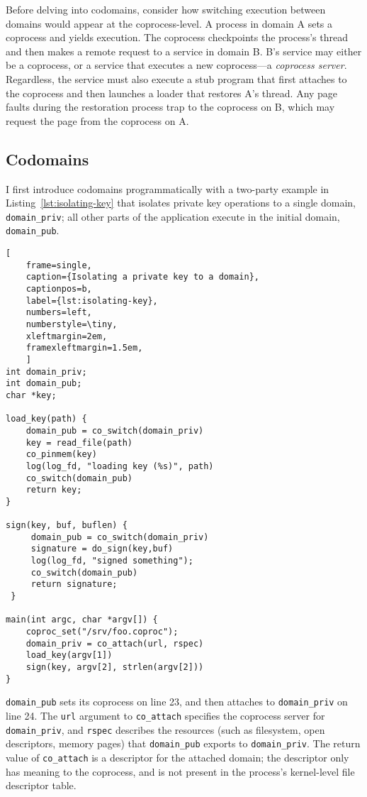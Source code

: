 %
Before delving into codomains, consider how switching execution between domains
would appear at the coprocess-level.
%
A process in domain A sets a coprocess and yields execution.
%
The coprocess checkpoints the process's thread and then makes a remote request
to a service in domain B\@.
%
B's service may either be a coprocess, or a service that executes a new
coprocess---a \emph{coprocess server}.
%
Regardless, the service must also execute a stub program that first attaches to
the coprocess and then launches a loader that restores A's thread.
%
Any page faults during the restoration process trap to the coprocess on B,
which may request the page from the coprocess on A.


\subsection{Codomains}

I first introduce codomains programmatically with a two-party example in
Listing~\ref{lst:isolating-key} that isolates private key operations to a
single domain, \texttt{domain\_priv}; all other parts of the application
execute in the initial domain, \texttt{domain\_pub}.

\begin{lstlisting}[
    frame=single, 
    caption={Isolating a private key to a domain},
    captionpos=b,
    label={lst:isolating-key},
    numbers=left,
    numberstyle=\tiny,
    xleftmargin=2em,
    framexleftmargin=1.5em,
    ]
int domain_priv;
int domain_pub;
char *key;

load_key(path) {
    domain_pub = co_switch(domain_priv)
    key = read_file(path)
    co_pinmem(key)
    log(log_fd, "loading key (%s)", path)
    co_switch(domain_pub)
    return key;
}
 
sign(key, buf, buflen) {
     domain_pub = co_switch(domain_priv)
     signature = do_sign(key,buf)
     log(log_fd, "signed something");
     co_switch(domain_pub)
     return signature; 
 }

main(int argc, char *argv[]) {
    coproc_set("/srv/foo.coproc");
    domain_priv = co_attach(url, rspec)
    load_key(argv[1])
    sign(key, argv[2], strlen(argv[2]))
}
\end{lstlisting}


\texttt{domain\_pub} sets its coprocess on line 23, and then attaches to 
\texttt{domain\_priv} on line 24.
%
The \texttt{url} argument to \texttt{co\_attach} specifies the coprocess server
for \texttt{domain\_priv}, and \texttt{rspec} describes the resources (such as
filesystem, open descriptors, memory pages) that \texttt{domain\_pub} exports
to \texttt{domain\_priv}.
%
The return value of \texttt{co\_attach} is a descriptor for the attached
domain; the descriptor only has meaning to the coprocess, and is not present
in the process's kernel-level file descriptor table.


